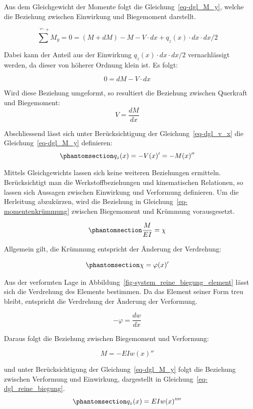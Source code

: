 \documentclass[
  12pt,
  letterpaper,
  egregdoesnotlikesansseriftitles]{scrreprt}
\begin{document}
Aus dem Gleichgewicht der Momente folgt die Gleichung~\ref{eq-dgl_M_y},
welche die Beziehung zwischen Einwirkung und Biegemoment darstellt.

\[
\sum^{\curvearrowleft+} M_y = 0 = (M+dM) - M - V \cdot dx + q_z(x)\cdot dx \cdot dx/2
\]

Dabei kann der Anteil aus der Einwirkung \(q_z(x)\cdot dx \cdot dx/2\)
vernachlässigt werden, da dieser von höherer Ordnung klein ist. Es
folgt:

\[
0 = dM - V \cdot dx
\]

Wird diese Beziehung umgeformt, so resultiert die Beziehung zwischen
Querkraft und Biegemoment: \[
V = \frac{dM}{dx} 
\]

Abschliessend lässt sich unter Berücksichtigung der
Gleichung~\ref{eq-dgl_v_x} die Gleichung~\ref{eq-dgl_M_y} definieren:
\begin{equation}\phantomsection\label{eq-dgl_M_y}{
q_z(x) = -V(x)'= -M(x)''
}\end{equation}

Mittels Gleichgewichts lassen sich keine weiteren Beziehungen ermitteln.
Berücksichtigt man die Werkstoffbeziehungen und kinematischen
Relationen, so lassen sich Aussagen zwischen Einwirkung und Verformung
definieren. Um die Herleitung abzukürzen, wird die Beziehung in
Gleichung~\ref{eq-momentenkrümmung} zwischen Biegemoment und Krümmung
vorausgesetzt.

\begin{equation}\phantomsection\label{eq-momentenkruxfcmmung}{
\frac{M}{EI} = \chi
}\end{equation}

Allgemein gilt, die Krümmung entspricht der Änderung der Verdrehung:

\begin{equation}\phantomsection\label{eq-krummung}{
\chi = \varphi(x)'
}\end{equation}

Aus der verformten Lage in
Abbildung~\ref{fig-system_reine_biegung_element} lässt sich die
Verdrehung des Elements bestimmen. Da das Element seiner Form treu
bleibt, entspricht die Verdrehung der Änderung der Verformung.

\[
-\varphi = \frac{dw}{dx}
\]

Daraus folgt die Beziehung zwischen Biegemoment und Verformung:

\[
M = -EIw(x)''
\]

und unter Berücksichtigung der Gleichung~\ref{eq-dgl_M_y} folgt die
Beziehung zwischen Verformung und Einwirkung, dargestellt in
Gleichung~\ref{eq-dgl_reine_biegung}.
\begin{equation}\phantomsection\label{eq-dgl_reine_biegung}{
q_z(x) = EIw(x)''''
}\end{equation}
\end{document}

